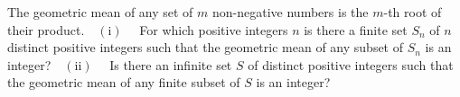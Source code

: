 The geometric mean of any set of $m$ non-negative numbers is the $m$-th root of their product.$\quad (\text{i})\quad$ For which positive integers $n$ is there a finite set $S_n$ of $n$ distinct positive integers such that the geometric mean of any subset of $S_n$ is an integer?$\quad (\text{ii})\quad$ Is there an infinite set $S$ of distinct positive integers such that the geometric mean of any finite subset of $S$ is an integer?